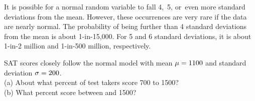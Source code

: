 It is possible for a normal random variable to fall 4,~5,
or~even more standard deviations from the mean.
However, these occurrences are very rare if the data are
nearly normal.
The probability of being further than 4 standard deviations
from the mean is about 1-in-15,000.
For 5 and 6 standard deviations, it is about 1-in-2 million
and 1-in-500 million, respectively.

\begin{exercisewrap}
\begin{nexercise}
SAT scores closely follow the normal model with mean
$\mu = 1100{}$ and standard deviation
$\sigma = 200{}$.\footnotemark{} \\
(a) About what percent of test takers score 700 to 1500? \\
(b) What percent score between \satmean{} and 1500?
\end{nexercise}
\end{exercisewrap}


{}




